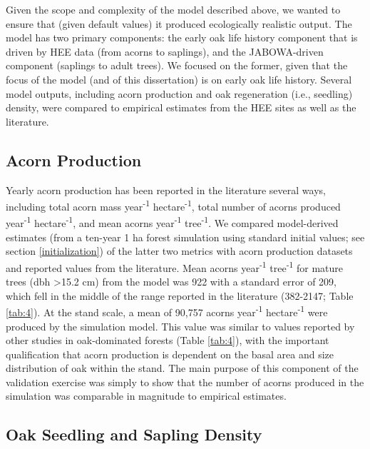 \documentclass[
11pt, %
a4paper, %
oneside, %
headinclude,footinclude, %
]{scrartcl}
\begin{document}
Given the scope and complexity of the model described above, we wanted to ensure that (given default values) it produced ecologically realistic output. The model has two primary components: the early oak life history component that is driven by HEE data (from acorns to saplings), and the JABOWA-driven component (saplings to adult trees). We focused on the former, given that the focus of the model (and of this dissertation) is on early oak life history. Several model outputs, including acorn production and oak regeneration (i.e., seedling) density, were compared to empirical estimates from the HEE sites as well as the literature. 

\subsection{Acorn Production}

Yearly acorn production has been reported in the literature several ways, including total acorn mass year\textsuperscript{-1} hectare\textsuperscript{-1}, total number of acorns produced year\textsuperscript{-1} hectare\textsuperscript{-1}, and mean acorns year\textsuperscript{-1} tree\textsuperscript{-1}.  We compared model-derived estimates (from a ten-year 1 ha forest simulation using standard initial values; see section \ref{initialization}) of the latter two metrics with acorn production datasets and reported values from the literature. Mean acorns year\textsuperscript{-1} tree\textsuperscript{-1} for mature trees (dbh \textgreater 15.2 cm) from the model was 922 with a standard error of 209, which fell in the middle of the range reported in the literature (382-2147; Table \ref{tab:4}). At the stand scale, a mean of 90,757 acorns year\textsuperscript{-1} hectare\textsuperscript{-1} were produced by the simulation model. This value was similar to values reported by other studies in oak-dominated forests (Table \ref{tab:4}), with the important qualification that acorn production is dependent on the basal area and size distribution of oak within the stand. The main purpose of this component of the validation exercise was simply to show that the number of acorns produced in the simulation was comparable in magnitude to empirical estimates.



\subsection{Oak Seedling and Sapling Density}
\end{document}
